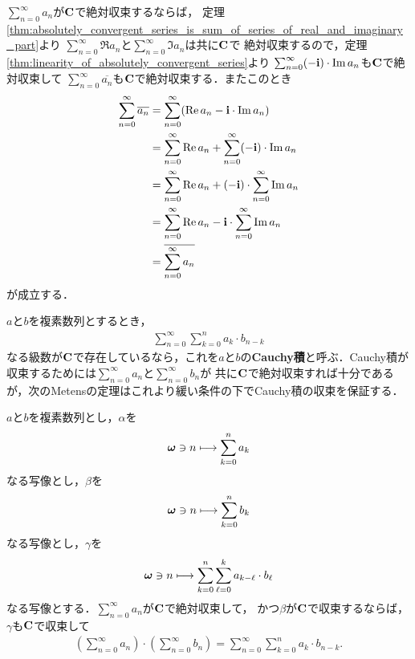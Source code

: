 	\begin{sketch}
		$\sum_{n=0}^\infty a_n$が$\mathbf{C}$で絶対収束するならば，
		定理\ref{thm:absolutely_convergent_series_is_sum_of_series_of_real_and_imaginary_part}より
		$\sum_{n=0}^\infty \Re{a_n}$と$\sum_{n=0}^\infty \Im{a_n}$は共に$\mathbf{C}$で
		絶対収束するので，定理\ref{thm:linearity_of_absolutely_convergent_series}より
		$\sum_{n=0}^\infty (- \mathbf{i}) \cdot \operatorname{Im} a_n$も$\mathbf{C}$で絶対収束して
		$\sum_{n=0}^\infty \overline{a_n}$も$\mathbf{C}$で絶対収束する．またこのとき
		\begin{align}
			\sum_{n=0}^\infty \overline{a_n}
			&= \sum_{n=0}^\infty (\operatorname{Re} a_n - \mathbf{i} \cdot \operatorname{Im} a_n) \\
			&= \sum_{n=0}^\infty \operatorname{Re} a_n + \sum_{n=0}^\infty (-\mathbf{i}) \cdot \operatorname{Im} a_n \\
			&= \sum_{n=0}^\infty \operatorname{Re} a_n + (-\mathbf{i}) \cdot \sum_{n=0}^\infty \operatorname{Im} a_n \\
			&= \sum_{n=0}^\infty \operatorname{Re} a_n - \mathbf{i} \cdot \sum_{n=0}^\infty \operatorname{Im} a_n \\
			&= \overline{\sum_{n=0}^\infty a_n}
		\end{align}
		が成立する．
		\QED
	\end{sketch}
	
	$a$と$b$を複素数列とするとき，
	\begin{align}
		\sum_{n=0}^\infty \sum_{k=0}^n a_k \cdot b_{n-k}
	\end{align}
	なる級数が$\mathbf{C}$で存在しているなら，これを$a$と$b$の{\bf Cauchy積}と呼ぶ．Cauchy積が収束するためには$\sum_{n=0}^\infty a_n$と$\sum_{n=0}^\infty b_n$が
	共に$\mathbf{C}$で絶対収束すれば十分であるが，次のMetensの定理はこれより緩い条件の下でCauchy積の収束を保証する．
	
	\begin{screen}
		\begin{thm}[一方が絶対収束していればCauchy積も収束する]\label{thm:convolution_of_absolutely_convergent_series}
			$a$と$b$を複素数列とし，$\alpha$を
			\begin{align}
				{\boldsymbol \omega} \ni n \longmapsto \sum_{k=0}^n a_k
			\end{align}
			なる写像とし，$\beta$を
			\begin{align}
				{\boldsymbol \omega} \ni n \longmapsto \sum_{k=0}^n b_k
			\end{align}
			なる写像とし，$\gamma$を
			\begin{align}
				{\boldsymbol \omega} \ni n \longmapsto \sum_{k=0}^n \sum_{\ell = 0}^k a_{k-\ell} \cdot b_\ell
			\end{align}
			なる写像とする．$\sum_{n=0}^\infty a_n$が$\mathbf{C}$で絶対収束して，
			かつ$\beta$が$\mathbf{C}$で収束するならば，$\gamma$も$\mathbf{C}$で収束して
			\begin{align}
				\left(\sum_{n=0}^\infty a_n\right) \cdot \left(\sum_{n=0}^\infty b_n\right)
				= \sum_{n=0}^\infty \sum_{k=0}^n a_k \cdot b_{n-k}.
			\end{align}
		\end{thm}
	\end{screen}
	
